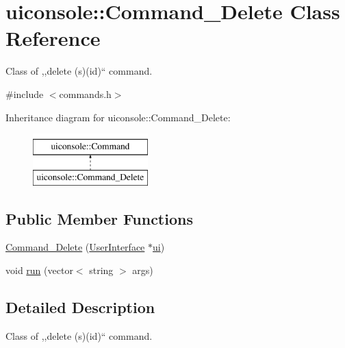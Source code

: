 \hypertarget{classuiconsole_1_1Command__Delete}{
\section{uiconsole::Command\_\-Delete Class Reference}
\label{d6/d90/classuiconsole_1_1Command__Delete}
}


Class of ,,delete (s)(id)`` command.  




{\ttfamily \#include $<$commands.h$>$}

Inheritance diagram for uiconsole::Command\_\-Delete:\begin{figure}[H]
\begin{center}
\leavevmode
\includegraphics[height=2.000000cm]{d6/d90/classuiconsole_1_1Command__Delete}
\end{center}
\end{figure}
\subsection*{Public Member Functions}
\begin{DoxyCompactItemize}
\item 
\hyperlink{classuiconsole_1_1Command__Delete_abce1cda7f9ef46226858d921e7fa1eb8}{Command\_\-Delete} (\hyperlink{classUserInterface}{UserInterface} $\ast$\hyperlink{classuiconsole_1_1Command_ab43ed5152860c099f858d62f9f556699}{ui})
\item 
void \hyperlink{classuiconsole_1_1Command__Delete_a1b3e129b6db759603d472d3a951d7743}{run} (vector$<$ string $>$ args)
\end{DoxyCompactItemize}


\subsection{Detailed Description}
Class of ,,delete (s)(id)`` command. 

